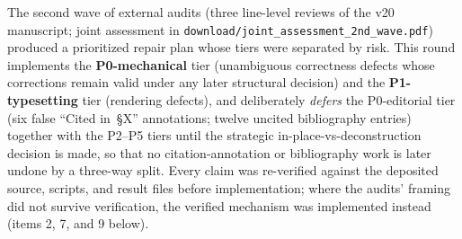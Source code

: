 \documentclass[11pt,a4paper]{article}
\theoremstyle{plain}
\theoremstyle{definition}
\theoremstyle{remark}
\begin{document}
The second wave of external audits (three line-level reviews of the
v20 manuscript; joint assessment in
\texttt{download/joint\_assessment\_2nd\_wave.pdf}) produced a
prioritized repair plan whose tiers were separated by risk. This
round implements the \textbf{P0-mechanical} tier (unambiguous
correctness defects whose corrections remain valid under any later
structural decision) and the \textbf{P1-typesetting} tier (rendering
defects), and deliberately \emph{defers} the P0-editorial tier (six
false ``Cited in~\S X'' annotations; twelve uncited bibliography
entries) together with the P2--P5 tiers until the strategic
in-place-vs-deconstruction decision is made, so that no
citation-annotation or bibliography work is later undone by a
three-way split. Every claim was re-verified against the deposited
source, scripts, and result files before implementation; where the
audits' framing did not survive verification, the verified mechanism
was implemented instead (items 2, 7, and 9 below).
\end{document}

